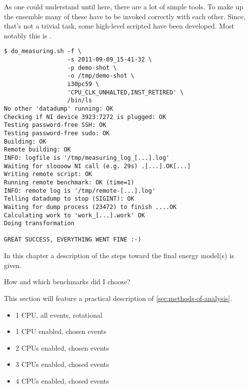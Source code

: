 As one could understand until here, there are a lot of simple tools. To make up
the ensemble many of these have to be invoked correctly with each other. Since,
that's not a trivial task, some high-level scripted have been developed. Most
notably this is \JWTdomeasuring.

\begin{lstlisting}[style=Shell]
$ do_measuring.sh -f \
                  -s 2011-09-09_15-41-32 \
                  -p demo-shot \
                  -o /tmp/demo-shot \
                  i30pc59 \
                  'CPU_CLK_UNHALTED,INST_RETIRED' \
                  /bin/ls
No other 'datadump' running: OK
Checking if NI device 3923:7272 is plugged: OK
Testing password-free SSH: OK
Testing password-free sudo: OK
Building: OK
Remote building: OK
INFO: logfile is '/tmp/measuring_log_[...].log'
Waiting for sloooow NI call (e.g. 29s) .[...].OK[...]
Writing remote script: OK
Running remote benchmark: OK (time=1)
INFO: remote log is '/tmp/remote-[...].log'
Telling datadump to stop (SIGINT): OK
Waiting for dump process (23472) to finish ....OK
Calculating work to 'work_[...].work' OK
Doing transformation

GREAT SUCCESS, EVERYTHING WENT FINE :-)
\end{lstlisting}


\label{sec:towards-the-model}

In this chapter a description of the steps toward the final energy model(s) is
given.


\label{sec:benchmarks}

How and which benchmarks did I choose?


\label{sec:finding-useful-subset}

This section will feature a practical description of
\ref{sec:methods-of-analysis}.

\begin{itemize}

\item 1 CPU, all events, rotational

\item 1 CPU enabled, chosen events

\item 2 CPUs enabled, chosen events

\item 3 CPUs enabled, chosed events

\item 4 CPUs enabled, chosed events

\end{itemize}


